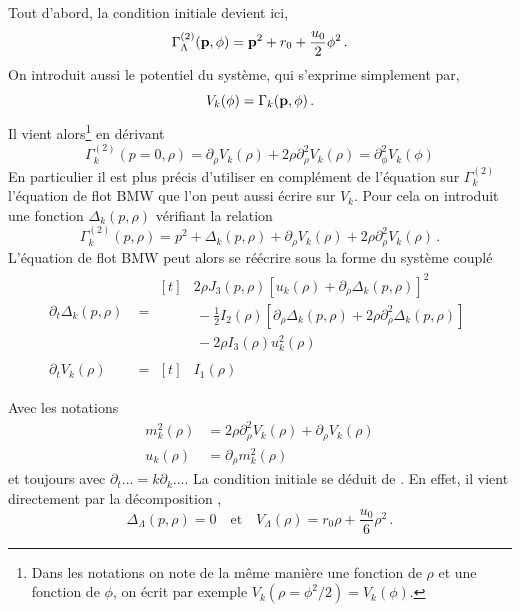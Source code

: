 \documentclass[10.5pt]{article}
\begin{document}
\begin{multicols}{2}
\label{ann:BMWON}

Tout d'abord, la condition initiale  devient ici,
\begin{equation}
	\Gamma^{(2)}_\Lambda({\bf p}, \phi) = {\bf p}^2 + r_0 + \frac{u_0}{2} \phi^2 \, .
	\label{eq:initBMWCont}
\end{equation}
On introduit aussi le potentiel du système, qui s'exprime simplement par,   
\begin{equation}
	V_k(\phi) = \Gamma_k({\bf p}, \phi) \, .
\end{equation}
Il vient alors\footnote{Dans les notations on note de la même manière une fonction de $\rho$ et une fonction de $\phi$, on écrit par exemple $V_k(\rho = \phi^2/2) = V_k(\phi)$.} en dérivant
\begin{equation}
	\Gamma^{(2)}_k(p=0, \rho) = \partial_{\rho}V_k(\rho) + 2\rho\partial_{\rho}^2 V_k(\rho) = \partial_{\phi}^2 V_k(\phi)
\end{equation}
En particulier il est plus précis d'utiliser en complément de l'équation sur $\Gamma^{(2)}_k$ l'équation de flot BMW que l'on peut aussi écrire sur $V_k$. Pour cela on introduit une fonction $\Delta_k(p, \rho)$ vérifiant la relation
\begin{equation}
	\Gamma^{(2)}_k(p, \rho) = p^2 + \Delta_k(p, \rho) + \partial_{\rho}V_k(\rho) + 2\rho\partial_{\rho}^2 V_k(\rho) \, .
	\label{eq:gammaDecomp}
\end{equation}
L'équation de flot BMW  peut alors se réécrire sous la forme du système couplé
\begin{align}
	\partial_t \Delta_k(p, \rho) & = 
	\begin{aligned}[t]
	 & 2\rho J_3(p,\rho){\left[u_k(\rho) + \partial_\rho \Delta_k (p,\rho) \right]}^{2} \\
	  & \, - \frac{1}{2}I_2(\rho) \left[\partial_\rho \Delta_k(p, \rho) +  2\rho \partial_\rho^2 \Delta_k(p,\rho) \right] \\
	 & \, - 2\rho I_3 (\rho) u_k^2(\rho) 
	 \end{aligned}
	\label{eqn:sysDeltaON1}\\
	\partial_t V_k(\rho) & = 
	\begin{aligned}[t]
		& I_1(\rho)
	\end{aligned}
	\label{eqn:sysDeltaON2}
\end{align}

Avec les notations
\begin{equation}
 \begin{split}
	m_k^2(\rho) & = 2\rho \partial_\rho^2 V_k(\rho) + \partial_\rho V_k(\rho)  \\
	u_k(\rho)  & = \partial_\rho m^2_k(\rho) \, 
	\end{split}	
\end{equation}
et toujours avec $\partial_t ... = k \partial_k ... $. La condition initiale se déduit de . En effet, il vient directement par la décomposition ,
\begin{equation}
\Delta_\Lambda (p,\rho) = 0 \quad \text{et} \quad V_\Lambda(\rho) = r_0\rho + \frac{u_0}{6}\rho^2 \, .
\end{equation}


\end{multicols}
\end{document}
